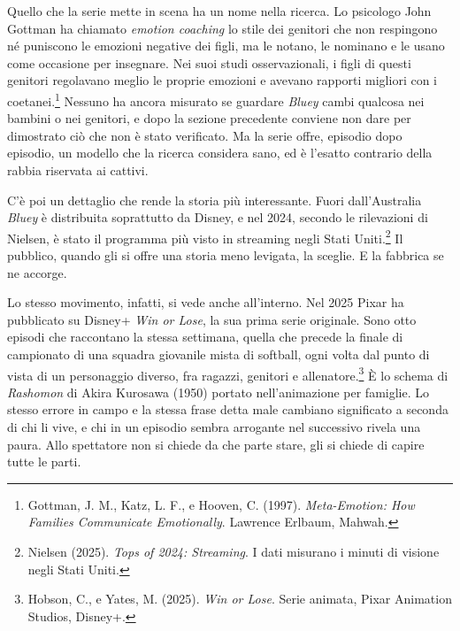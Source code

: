 
Quello che la serie mette in scena ha un nome nella ricerca. Lo psicologo John Gottman ha chiamato \textit{emotion coaching} lo stile dei genitori che non respingono né puniscono le emozioni negative dei figli, ma le notano, le nominano e le usano come occasione per insegnare. Nei suoi studi osservazionali, i figli di questi genitori regolavano meglio le proprie emozioni e avevano rapporti migliori con i coetanei.\footnote{Gottman, J. M., Katz, L. F., e Hooven, C. (1997). \textit{Meta-Emotion: How Families Communicate Emotionally}. Lawrence Erlbaum, Mahwah.} Nessuno ha ancora misurato se guardare \textit{Bluey} cambi qualcosa nei bambini o nei genitori, e dopo la sezione precedente conviene non dare per dimostrato ciò che non è stato verificato. Ma la serie offre, episodio dopo episodio, un modello che la ricerca considera sano, ed è l'esatto contrario della rabbia riservata ai cattivi.

C'è poi un dettaglio che rende la storia più interessante. Fuori dall'Australia \textit{Bluey} è distribuita soprattutto da Disney, e nel 2024, secondo le rilevazioni di Nielsen, è stato il programma più visto in streaming negli Stati Uniti.\footnote{Nielsen (2025). \textit{Tops of 2024: Streaming}. I dati misurano i minuti di visione negli Stati Uniti.} Il pubblico, quando gli si offre una storia meno levigata, la sceglie. E la fabbrica se ne accorge.

Lo stesso movimento, infatti, si vede anche all'interno. Nel 2025 Pixar ha pubblicato su Disney+ \textit{Win or Lose}, la sua prima serie originale. Sono otto episodi che raccontano la stessa settimana, quella che precede la finale di campionato di una squadra giovanile mista di softball, ogni volta dal punto di vista di un personaggio diverso, fra ragazzi, genitori e allenatore.\footnote{Hobson, C., e Yates, M. (2025). \textit{Win or Lose}. Serie animata, Pixar Animation Studios, Disney+.} È lo schema di \textit{Rashomon} di Akira Kurosawa (1950) portato nell'animazione per famiglie. Lo stesso errore in campo e la stessa frase detta male cambiano significato a seconda di chi li vive, e chi in un episodio sembra arrogante nel successivo rivela una paura. Allo spettatore non si chiede da che parte stare, gli si chiede di capire tutte le parti.

